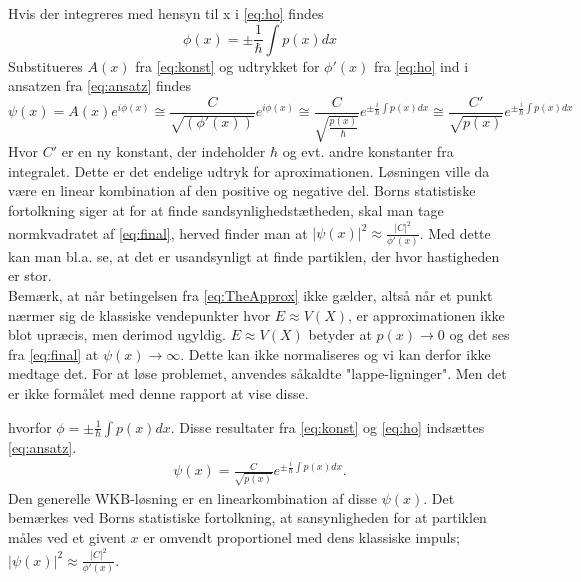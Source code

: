 Hvis der integreres med hensyn til x i \cref{eq:ho} findes
%
\begin{equation}
    \phi(x) = \pm \frac{1}{\hbar} \int p(x) dx
    \label{eq:thisPhi}
\end{equation}
%
Substitueres $A(x)$ fra \cref{eq:konst} og udtrykket for $\phi{'\left (x \right )}$ fra \cref{eq:ho}  ind i ansatzen fra \cref{eq:ansatz} findes
%
\begin{equation}
    \psi(x) = A(x) e^{i \phi(x)} \cong
    \frac{C}{\sqrt{( \phi{'\left (x \right )})}} e^{i \phi(x)} \cong
    \frac{C}{\sqrt{\frac{p(x)}{\hbar}}} e^{\pm \frac{i}{\hbar} \int p(x) dx} \cong
    \frac{C'}{\sqrt{p(x)}} e^{\pm \frac{i}{\hbar} \int p(x) dx}
    \label{eq:final}
\end{equation}
%
Hvor $C'$ er en ny konstant, der indeholder $\hbar$ og evt. andre konstanter fra integralet. Dette er det endelige udtryk for aproximationen. Løsningen ville da være en linear kombination af den positive og negative del. Borns statistiske fortolkning siger at for at finde sandsynlighedstætheden, skal man tage normkvadratet af \cref{eq:final}, herved finder man at $|\psi(x)|^2 \approx \frac{|C|^2}{\phi'(x)}$. Med dette kan man bl.a. se, at det er usandsynligt at finde partiklen, der hvor hastigheden er stor.
\\
Bemærk, at når betingelsen fra \cref{eq:TheApprox} ikke gælder, altså når et punkt nærmer sig de klassiske vendepunkter hvor $E \approx V(X)$, er approximationen ikke blot upræcis, men derimod ugyldig. $E \approx V(X)$ betyder at $p(x) \rightarrow 0$ og det ses fra \cref{eq:final}  at $\psi(x) \rightarrow \infty$. Dette kan ikke normaliseres og vi kan derfor ikke medtage det. For at løse problemet, anvendes såkaldte "lappe-ligninger". Men det er ikke formålet med denne rapport at vise disse.



hvorfor $\phi = \pm \frac{1}{\hbar}\int p(x) dx$. Disse resultater fra \cref{eq:konst} og \cref{eq:ho} indsættes \cref{eq:ansatz}.
\begin{align}
    \psi(x) = \frac{C}{\sqrt{p(x)}}e^{\pm \frac{i}{\hbar}\int p(x) dx}.
    \label{eqpsi}
\end{align}
Den generelle WKB-løsning er en linearkombination af disse $\psi(x)$. Det bemærkes ved Borns statistiske fortolkning, at sansynligheden for at partiklen måles ved et givent $x$ er omvendt proportionel med dens klassiske impuls; $|\psi(x)|^2 \approx \frac{|C|^2}{\phi'(x)}$.
